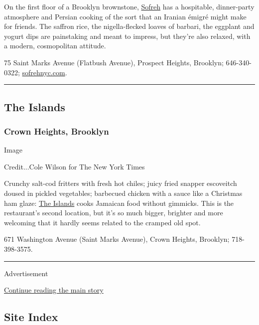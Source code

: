 On the first floor of a Brooklyn brownstone,
\href{https://www.nytimes3xbfgragh.onion/2018/09/11/dining/sofreh-review.html}{Sofreh}
has a hospitable, dinner-party atmosphere and Persian cooking of the
sort that an Iranian émigré might make for friends. The saffron rice,
the nigella-flecked loaves of barbari, the eggplant and yogurt dips are
painstaking and meant to impress, but they're also relaxed, with a
modern, cosmopolitan attitude.

75 Saint Marks Avenue (Flatbush Avenue), Prospect Heights, Brooklyn;
646-340-0322; \href{http://www.sofrehnyc.com/}{sofrehnyc.com}.

\begin{center}\rule{0.5\linewidth}{\linethickness}\end{center}

\hypertarget{the-islands}{%
\subsection{The Islands}\label{the-islands}}

\hypertarget{crown-heights-brooklyn}{%
\subsubsection{Crown Heights, Brooklyn}\label{crown-heights-brooklyn}}

Image

Credit...Cole Wilson for The New York Times

Crunchy salt-cod fritters with fresh hot chiles; juicy fried snapper
escoveitch doused in pickled vegetables; barbecued chicken with a sauce
like a Christmas ham glaze:
\href{https://www.nytimes3xbfgragh.onion/2018/06/26/dining/the-islands-review.html}{The
Islands} cooks Jamaican food without gimmicks. This is the restaurant's
second location, but it's so much bigger, brighter and more welcoming
that it hardly seems related to the cramped old spot.

671 Washington Avenue (Saint Marks Avenue), Crown Heights, Brooklyn;
718-398-3575.

\begin{center}\rule{0.5\linewidth}{\linethickness}\end{center}

Advertisement

\protect\hyperlink{after-bottom}{Continue reading the main story}

\hypertarget{site-index}{%
\subsection{Site Index}\label{site-index}}

